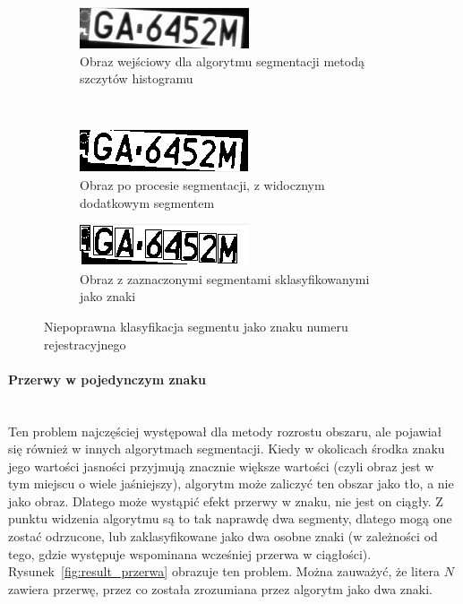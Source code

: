 \begin{figure}
  \centering
  \begin{subfigure}[b]{0.45\textwidth}
    \includegraphics[width=\textwidth]{img/result-euro-input}
    \caption{Obraz wejściowy dla algorytmu segmentacji metodą szczytów histogramu}
    \label{fig:result_euro_input}
  \end{subfigure}
  ~
  \begin{subfigure}[b]{0.45\textwidth}
    \includegraphics[width=\textwidth]{img/result-euro-bad}
    \caption{Obraz po procesie segmentacji, z widocznym dodatkowym segmentem}
    \label{fig:result_euro_bad}
  \end{subfigure}
\begin{subfigure}[b]{0.45\textwidth}
    \includegraphics[width=\textwidth]{img/result-euro-output}
    \caption{Obraz z zaznaczonymi segmentami sklasyfikowanymi jako znaki}
    \label{fig:result_euro_output}
  \end{subfigure}
  \caption{Niepoprawna klasyfikacja segmentu jako znaku numeru rejestracyjnego}
  \label{fig:result_euro}
\end{figure}

\paragraph{Przerwy w pojedynczym znaku}\mbox{} \\
Ten problem najczęściej występował dla metody rozrostu obszaru, ale pojawiał się również w innych algorytmach segmentacji. Kiedy w okolicach środka znaku jego wartości jasności przyjmują znacznie większe wartości (czyli obraz jest w tym miejscu o wiele jaśniejszy), algorytm może zaliczyć ten obszar jako tło, a nie jako obraz. Dlatego może wystąpić efekt przerwy w znaku, nie jest on ciągły. Z punktu widzenia algorytmu są to tak naprawdę dwa segmenty, dlatego mogą one zostać odrzucone, lub zaklasyfikowane jako dwa osobne znaki (w zależności od tego, gdzie występuje wspominana wcześniej przerwa w ciągłości). Rysunek~\ref{fig:result_przerwa} obrazuje ten problem. Można zauważyć, że litera $N$ zawiera przerwę, przez co została zrozumiana przez algorytm jako dwa znaki.

